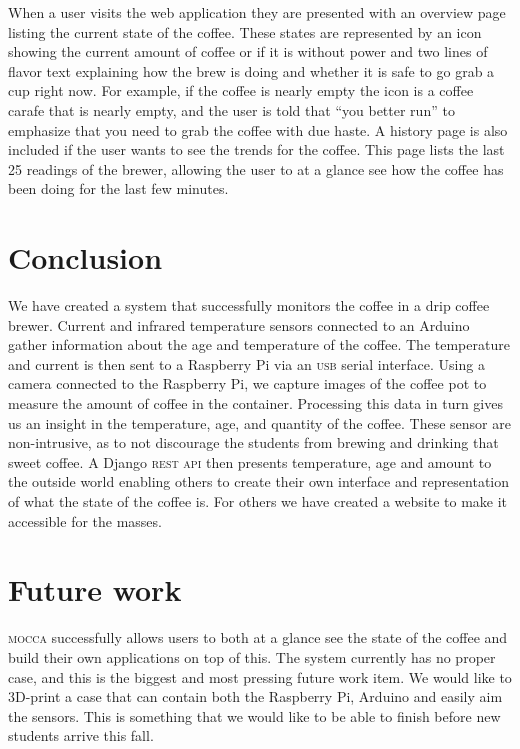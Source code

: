 \documentclass[12pt,a4paper,oneside,article]{memoir}
\numberwithin{equation}{chapter}
\begin{document}
When a user visits the web application they are presented with an overview page
listing the current state of the coffee. These states are represented by an icon
showing the current amount of coffee or if it is without power and two lines of
flavor text explaining how the brew is doing and whether it is safe to go grab a
cup right now. For example, if the coffee is nearly empty the icon is a coffee
carafe that is nearly empty, and the user is told that ``you better run'' to
emphasize that you need to grab the coffee with due haste. A history page is
also included if the user wants to see the trends for the coffee. This page
lists the last 25 readings of the brewer, allowing the user to at a glance see
how the coffee has been doing for the last few minutes.

\section{Conclusion}\label{sec:conclusion}
We have created a system that successfully monitors the coffee in a drip coffee
brewer. Current and infrared temperature sensors connected to an Arduino gather
information about the age and temperature of the coffee. The temperature and
current is then sent to a Raspberry Pi via an \textsc{usb} serial interface.
Using a camera connected to the Raspberry Pi, we capture images of the coffee
pot to measure the amount of coffee in the container. Processing this data in
turn gives us an insight in the temperature, age, and quantity of the coffee.
These sensor are non-intrusive, as to not discourage the students from brewing
and drinking that sweet coffee. A Django \textsc{rest api} then presents
temperature, age and amount to the outside world enabling others to create their
own interface and representation of what the state of the coffee is. For others
we have created a website to make it accessible for the masses.
 
\section{Future work}\label{sec:future-work}
\textsc{mocca} successfully allows users to both at a glance see the state of
the coffee and build their own applications on top of this. The system currently
has no proper case, and this is the biggest and most pressing future work item.
We would like to 3D-print a case that can contain both the Raspberry Pi, Arduino
and easily aim the sensors. This is something that we would like to be able to
finish before new students arrive this fall.
\end{document}
